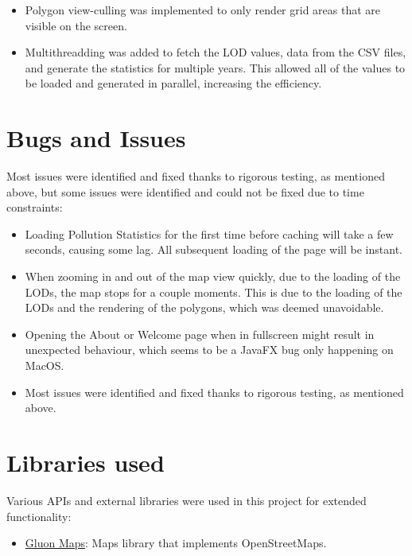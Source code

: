 \documentclass[10pt, a4paper]{scrartcl}
\begin{document}
\begin{multicols}{2}
\begin{itemize}
    \item Polygon view-culling was implemented to only render grid areas that are visible on the screen.
    
    \item Multithreadding was added to fetch the LOD values, data from the CSV files, and generate the statistics for
    multiple years. This allowed all of the values to be loaded and generated in parallel, increasing the efficiency.
\end{itemize}

\section{Bugs and Issues}

Most issues were identified and fixed thanks to rigorous testing, as mentioned above, but some issues were identified
and could not be fixed due to time constraints:

\begin{itemize}
    \itemsep-0.3em
    \item Loading Pollution Statistics for the first time before caching will take a few seconds, causing some lag. All
    subsequent loading of the page will be instant.
    
    \item When zooming in and out of the map view quickly, due to the loading of the LODs, the map stops for a couple
    moments. This is due to the loading of the LODs and the rendering of the polygons, which was deemed unavoidable.

    \item Opening the About or Welcome page when in fullscreen might result in unexpected behaviour, which seems to be 
    a JavaFX bug only happening on MacOS.
        
    \item Most issues were identified and fixed thanks to rigorous testing, as mentioned above.
\end{itemize}

\section{Libraries used}

\noindent Various APIs and external libraries were used in this project for extended functionality:

\begin{itemize}
    \itemsep-0.3em
    \item \href{https://github.com/gluonhq/maps}{Gluon Maps}: Maps library that implements OpenStreetMaps.


\end{itemize}
\end{multicols}
\end{document}
